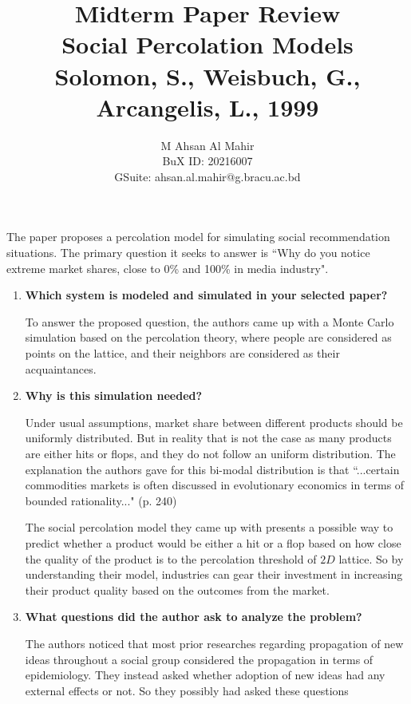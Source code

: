 \documentclass[article, 11pt, a4paper]{memoir}
\title{\vspace{-3.5em}\Large\textbf{Midterm Paper Review}\\[1em] \LARGE \textbf{Social
Percolation Models} \\ \Large Solomon, S., Weisbuch, G., Arcangelis, L., 1999}
\author{M Ahsan Al Mahir\\ \small BuX ID: 20216007\\ \small GSuite: ahsan.al.mahir@g.bracu.ac.bd}
\begin{document}
\maketitle


The paper proposes a percolation model for simulating social recommendation situations.
The primary question it seeks to answer is ``Why do you notice extreme market shares, close
to 0\% and 100\% in media industry". 




\begin{enumerate}[left=0pt, itemsep=20pt, label={\(\square\)}]

    \item \textbf{Which system is modeled and simulated in your selected paper? }

        To answer the proposed question, the authors came up with a Monte Carlo simulation
        based on the percolation theory, where people are considered as points on the
        lattice, and their neighbors are considered as their acquaintances. 

    \item \textbf{Why is this simulation needed? }

        Under usual assumptions, market share between different products should be
        uniformly distributed. But in reality that is not the case as many products are
        either hits or flops, and they do not follow an uniform distribution. The
        explanation the authors gave for this bi-modal distribution is that ``...certain
        commodities markets is often discussed in evolutionary economics in terms of
        bounded rationality..." (p. 240)

        The social percolation model they came up with presents a possible way to predict
        whether a product would be either a hit or a flop based on how close the quality
        of the product is to the percolation threshold of \(2D\) lattice. So by
        understanding their model, industries can gear their investment in increasing
        their product quality based on the outcomes from the market.

    \item \textbf{What questions did the author ask to analyze the problem? }

        The authors noticed that most prior researches regarding propagation of new ideas
        throughout a social group considered the propagation in terms of epidemiology.
        They instead asked whether adoption of new ideas had any external effects or not.
        So they possibly had asked these questions


\end{enumerate}
\end{document}
